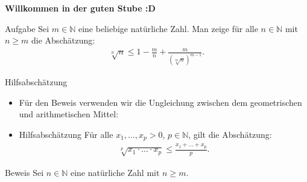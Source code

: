 \documentclass[10pt]{beamer}
\title{}
\author{Artur's Mathematikstübchen}
\date{}
\def\bN{\mathbb{N}}
\begin{document}

\begin{frame}
    \begin{center}
        \textbf{\huge Willkommen in der guten Stube \newline \newline :D}
    \end{center}
\end{frame}




\begin{frame}{}
    \begin{alertblock}{Aufgabe}
        Sei \( m \in \bN \) eine beliebige natürliche Zahl. Man zeige für alle \( n \in \bN \) mit \( n \geq m \) die Abschätzung:
        \begin{align*}
            \sqrt[n]{n}
            \leq 1 - \frac{m}{n} + \frac{m}{\left( \sqrt[m]{n} \right)^{m - 1}}.
        \end{align*}
    \end{alertblock}
\end{frame}



\begin{frame}{Hilfsabschätzung}
    \begin{itemize}
        \item<1->  Für den Beweis verwenden wir die Ungleichung zwischen dem geometrischen und arithmetischen Mittel:   
        \item<2-> 
        \begin{block}{Hilfsabschätzung}
            Für alle \( x_{1}, \ldots, x_{p} > 0 \), \( p \in \bN \), gilt die Abschätzung:
            \begin{align*}
                \sqrt[p]{x_{1} \cdot \ldots \cdot x_{p}} 
                \leq \frac{x_{1} + \ldots + x_{p}}{p}.
            \end{align*}
        \end{block} 
    \end{itemize}
\end{frame}



\begin{frame}{Beweis}
    Sei \( n \in \bN \) eine natürliche Zahl mit \( n \geq m \).
\end{frame}
\end{document}
